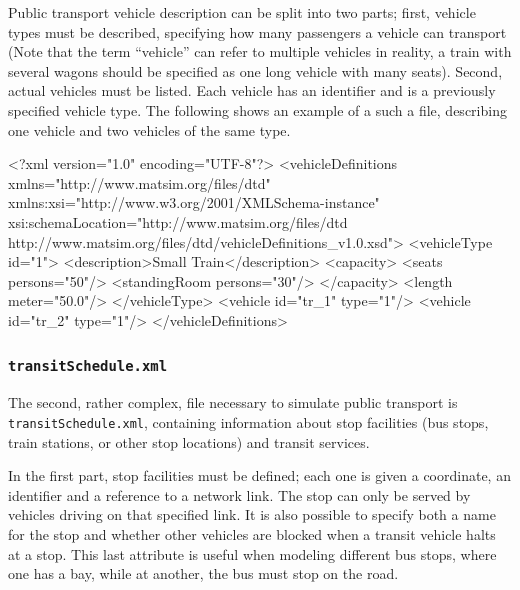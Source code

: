 Public transport vehicle description can be split into two parts; first, vehicle types must be described, specifying how many passengers a vehicle can transport (Note that the term ``vehicle'' can refer to multiple vehicles in reality, \eg a train with several wagons should be specified as one long vehicle with many seats). Second, actual vehicles must be listed. Each vehicle has an identifier and is a previously specified vehicle type. The following shows an example of a such a file, describing one vehicle  and two vehicles of the same type. 

\begin{xml}
<?xml version="1.0" encoding="UTF-8"?> 
<vehicleDefinitions xmlns="http://www.matsim.org/files/dtd" 
       xmlns:xsi="http://www.w3.org/2001/XMLSchema-instance" 
       xsi:schemaLocation="http://www.matsim.org/files/dtd http://www.matsim.org/files/dtd/vehicleDefinitions_v1.0.xsd"> 
	<vehicleType id="1"> 
      <description>Small Train</description> 
      <capacity> 
         <seats persons="50"/> 
         <standingRoom persons="30"/> 
      </capacity> 
      <length meter="50.0"/> 
   </vehicleType> 
   <vehicle id="tr_1" type="1"/> 
   <vehicle id="tr_2" type="1"/> 
</vehicleDefinitions>
\end{xml}

\subsubsection{\lstinline|transitSchedule.xml|}
\label{sec:inputdata:transitschedule}
The second, rather complex, file necessary to simulate public transport is \lstinline|transitSchedule.xml|, containing information about stop facilities (bus stops, train stations, or other stop locations) and transit services.

In the first part, stop facilities must be defined; each one is given a coordinate, an identifier and a reference to a network link. The stop can only be served by vehicles driving on that specified link. It is also possible to specify both a name for the stop and whether other vehicles are blocked when a transit vehicle halts at a stop. This last attribute is useful when modeling \eg different bus stops, where one has a bay, while at another, the bus must stop on the road.

